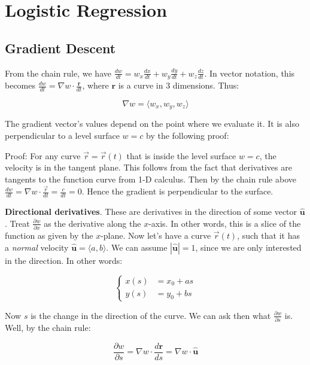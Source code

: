 \documentclass{article}
\newcommand{\vf}[1]{\mathbf{#1}}
\begin{document}
\section{Logistic Regression}
\subsection{Gradient Descent}
From the chain rule, we have $\frac{dw}{dt} = w_x \frac{dx}{dt} + w_y \frac{dy}{dt} + w_z \frac{dz}{dt}$. In vector notation, this becomes $\frac{dw}{dt} = \nabla w \cdot \frac{\vf{r}}{dt}$, where $\vf{r}$ is a curve in 3 dimensions. Thus:

\begin{equation*}
    \nabla w = \langle w_x, w_y, w_z \rangle
\end{equation*}

The gradient vector's values depend on the point where we evaluate it. It is also perpendicular to a level surface $w = c$ by the following proof:
\vskip 0.1in

Proof: For any curve $\vec{r} = \vec{r}(t)$ that is inside the level surface $w = c$, the velocity is in the tangent plane. This follows from the fact that derivatives are tangents to the function curve from 1-D calculus. Then by the chain rule above $\frac{dw}{dt} = \nabla w \cdot \frac{\vec{r}}{dt} = \frac{c}{dt} = 0$. Hence the gradient is perpendicular to the surface.
\vskip 0.1in

\textbf{Directional derivatives}. These are derivatives in the direction of some vector $\hat{\mathbf{u}}$. Treat $\frac{\partial w}{\partial x}$ as the derivative along the $x$-axis. In other words, this is a slice of the function as given by the $x$-plane. Now let's have a curve $\vec{r}(t)$, such that it has a \textit{normal} velocity $\hat{\mathbf{u}} = \langle a, b \rangle$. We can assume $|\hat{\mathbf{u}}| = 1$, since we are only interested in the direction. In other words:

\begin{equation*}
    \begin{cases}
        x(s) &= x_0 + as \\
        y(s) &= y_0 + bs
    \end{cases}
\end{equation*}

Now $s$ is the change in the direction of the curve. We can ask then what $\frac{\partial w}{\partial s}$ is. Well, by the chain rule:

\begin{equation*}
    \frac{\partial w}{\partial s} = \nabla w \cdot \frac{d\vf{r}}{ds} = \nabla w \cdot \hat{\mathbf{u}}
\end{equation*}
\end{document}
